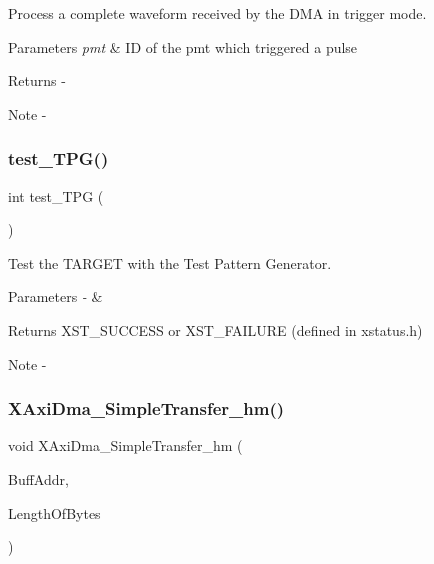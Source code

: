 Process a complete waveform received by the D\+MA in trigger mode. 


\begin{DoxyParams}{Parameters}
{\em pmt} & ID of the pmt which triggered a pulse\\
\hline
\end{DoxyParams}
\begin{DoxyReturn}{Returns}
-\/
\end{DoxyReturn}
\begin{DoxyNote}{Note}
-\/ 
\end{DoxyNote}
\mbox{\label{axis__peripheral_8h_afc766563120c4048da238dee8ac2ea49}} 
\subsubsection{test\_TPG()}
{\footnotesize\ttfamily int test\+\_\+\+T\+PG (\begin{DoxyParamCaption}\item[{void}]{ }\end{DoxyParamCaption})}



Test the T\+A\+R\+G\+ET with the Test Pattern Generator. 


\begin{DoxyParams}{Parameters}
{\em -\/} & \\
\hline
\end{DoxyParams}
\begin{DoxyReturn}{Returns}
X\+S\+T\+\_\+\+S\+U\+C\+C\+E\+SS or X\+S\+T\+\_\+\+F\+A\+I\+L\+U\+RE (defined in xstatus.\+h)
\end{DoxyReturn}
\begin{DoxyNote}{Note}
-\/ 
\end{DoxyNote}
\mbox{\label{axis__peripheral_8h_aec2c436529dde9db3cac39062e46cce4}} 
\subsubsection{XAxiDma\_SimpleTransfer\_hm()}
{\footnotesize\ttfamily void X\+Axi\+Dma\+\_\+\+Simple\+Transfer\+\_\+hm (\begin{DoxyParamCaption}\item[{U\+I\+N\+T\+P\+TR}]{Buff\+Addr,  }\item[{int}]{Length\+Of\+Bytes }\end{DoxyParamCaption})}



